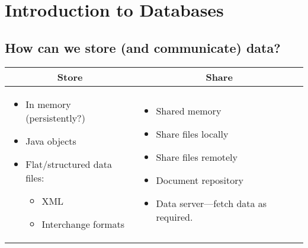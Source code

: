 \chapter{Introduction to Databases}
\section{How can we store (and communicate) data?}
\begin{tabular}{|p{}|p{}|}
\hline
\multicolumn{1}{|c|}{\textbf{Store}} & \multicolumn{1}{c|}{\textbf{Share}} \\
\hline

\begin{itemize}
	\item In memory (persistently?)
	\item Java objects
	\item Flat/structured data files:
		\begin{itemize}
			\item XML
			\item Interchange formats
		\end{itemize}
\end{itemize}

&

\begin{itemize}
	\item Shared memory
	\item Share files locally
	\item Share files remotely
	\item Document repository
	\raggedright\item Data server---fetch data as required.
\end{itemize}

\\
\hline
\end{tabular}